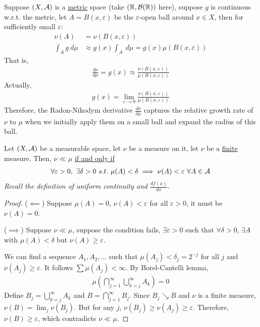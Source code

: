 \documentclass[11pt]{article}
\newcommand{\dmu}[0]{\ d\mu}
\begin{document}
	\begin{example}
		Suppose $(X, \mathcal{{A}})$ is a \ul{metric} space (take $(\mathbb{R}, \mathcal{{B}}(\mathbb{R}))$ here), suppose $g$ is continuous w.r.t. the metric, let $A = B(x, \varepsilon)$ be the $\varepsilon$-open ball around $x \in X$, then for sufficiently small $\varepsilon$:
		\begin{align}
			\nu(A) &= \nu(B(x, \varepsilon)) \\
			\int_A g\dmu &\approx g(x) \int_A \dmu = g(x) \mu(B(x, \varepsilon))
		\end{align}
		That is,
		\begin{align}
			\frac{d\nu}{d\mu} = g(x) \approx \frac{\nu(B(x, \varepsilon))}{\mu(B(x, \varepsilon))}
		\end{align}
		Actually,
		\begin{align}
			g(x) = \lim_{\varepsilon \to 0} \frac{\nu(B(x, \varepsilon))}{\mu(B(x, \varepsilon))}
		\end{align}
		Therefore, the Radon-Nikodym derivative $\frac{d\nu}{d\mu}$ captures the relative growth rate of $\nu$ to $\mu$ when we initially apply them on a small ball and expand the radius of this ball.
	\end{example}
	
	\begin{lemma}
		Let $(X, \mathcal{{A}})$ be a measurable space, let $\nu$ be a measure on it, let $\nu$ be a \ul{finite} measure. Then, $\nu \ll \mu$ \ul{if and only if}
		\begin{align}
			\forall \varepsilon > 0,\ \exists \delta > 0\ s.t.\ \mu(A) < \delta \implies \nu(A) < \varepsilon\ \forall A \in \mc{A}
		\end{align}
		\emph{Recall the definition of uniform continuity and $\frac{df(x)}{dx}$.}
		\begin{proof}
			($\impliedby$) Suppose $\mu(A) = 0$, $\nu(A) < \varepsilon$ for all $\varepsilon > 0$, it must be $\nu(A) = 0$.
		
			($\implies$) Suppose $\nu \ll \mu$, suppose the condition fails, $\exists \varepsilon > 0$ such that $\forall \delta > 0$, $\exists A$ with $\mu(A) < \delta$ but $\nu(A) \geq \varepsilon$.

			We can find a sequence $A_1, A_2, \dots$ such that $\mu(A_j) < \delta_j = 2^{-j}$ for all $j$ and $\nu(A_j) \geq \varepsilon$. It follows $\sum \mu(A_j) < \infty$. By Borel-Cantelli lemma,
			\begin{align}
				\mu\left(\bigcap_{j=1}^\infty \bigcup_{k=j}^\infty A_k\right) = 0
			\end{align}
			Define $B_j = \bigcup_{k=j}^\infty A_k$ and $B = \bigcap_{j=1}^\infty B_j$. Since $B_j \searrow B$ and $\nu$ is a finite measure, $\nu(B) = \lim_j \nu(B_j)$. But for any $j$, $\nu(B_j) \geq \nu(A_j) \geq \varepsilon$. Therefore, $\nu(B) \geq \varepsilon$, which contradicts $\nu \ll \mu$.
		\end{proof}
	\end{lemma}
	
\end{document}
